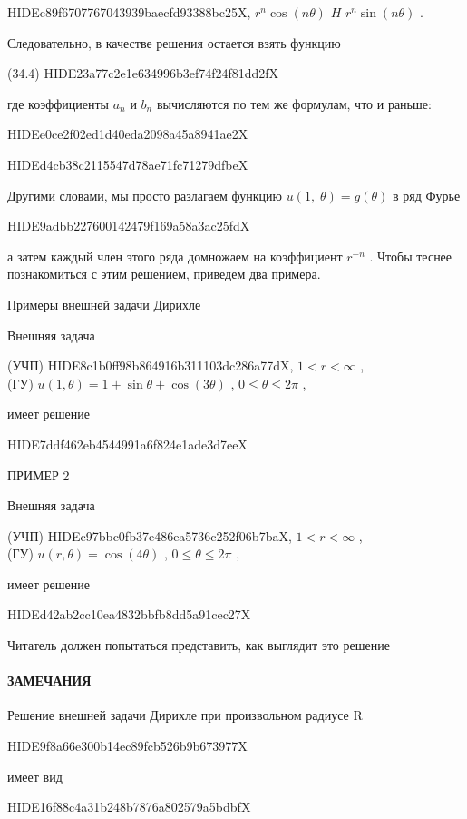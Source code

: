 \documentclass[
  ukrainian,
]{article}
\begin{document}
HIDEc89f6707767043939baecfd93388bc25X, \(r^n \cos(n\theta)\) \(H\)
\(r^n \sin(n\theta)\) .

Следовательно, в качестве решения остается взять функцию

(34.4) HIDE23a77c2e1e634996b3ef74f24f81dd2fX

где коэффициенты \(a_n\) и \(b_n\) вычисляются по тем же формулам, что и
раньше:

HIDEe0ce2f02ed1d40eda2098a45a8941ae2X

HIDEd4cb38c2115547d78ae71fc71279dfbeX

Другими словами, мы просто разлагаем функцию
\(u\left(1,\;\theta\right)=g\left(\theta\right)\) в ряд Фурье

HIDE9adbb227600142479f169a58a3ac25fdX

а затем каждый член этого ряда домножаем на коэффициент \(r^{-n}\) .
Чтобы теснее познакомиться с этим решением, приведем два примера.

Примеры внешней задачи Дирихле

Внешняя задача

(УЧП) HIDE8c1b0ff98b864916b311103dc286a77dX, \(1 < r < \infty\) ,\\
(ГУ) \(u(1, \theta) = 1 + \sin \theta + \cos (3\theta)\) ,
\(0 \le \theta \le 2\pi\) ,

имеет решение

HIDE7ddf462eb4544991a6f824e1ade3d7eeX

ПРИМЕР 2

Внешняя задача

(УЧП) HIDEc97bbc0fb37e486ea5736c252f06b7baX, \(1 < r < \infty\) ,\\
(ГУ) \(u(r, \theta) = \cos(4\theta)\) , \(0 \le \theta \le 2\pi\) ,

имеет решение

HIDEd42ab2cc10ea4832bbfb8dd5a91cec27X

Читатель должен попытаться представить, как выглядит это решение

\paragraph{ЗАМЕЧАНИЯ}\label{ux437ux430ux43cux435ux447ux430ux43dux438ux44f-1}

Решение внешней задачи Дирихле при произвольном радиусе R

HIDE9f8a66e300b14ec89fcb526b9b673977X

имеет вид

HIDE16f88c4a31b248b7876a802579a5bdbfX
\end{document}

